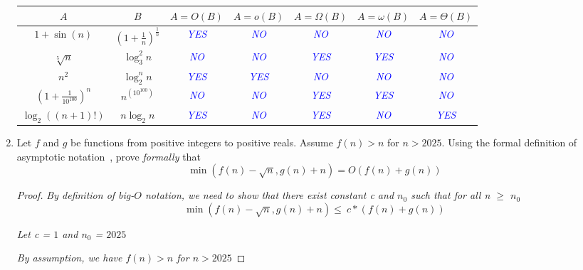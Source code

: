 \documentclass[dvipsnames]{article}
\begin{document}
\begin{enumerate}
    \begin{center}
    \bgroup
    \def\arraystretch{1.5}
    \begin{tabular}{ |c|c||c|c|c|c|c| }
     \hline
     $A$ & $B$ & $A = O(B)$ & $A = o(B)$ & $A = \Omega(B)$ & $A = \omega(B)$ & $A = \Theta(B)$ \\
     \hline
     \hline
     $1 + \sin(n)$ & $\left(1 + \frac{1}{n}\right)^{\frac{1}{n}}$ & \textcolor{blue}{\emph{YES}} & \textcolor{blue}{\emph{NO}} & \textcolor{blue}{\emph{NO}} & \textcolor{blue}{\emph{NO}} & \textcolor{blue}{\emph{NO}} \\
     \hline
     $\sqrt[5]{n}$ & $\log_3^2 n$ & \textcolor{blue}{\emph{NO}} & \textcolor{blue}{\emph{NO}} & \textcolor{blue}{\emph{YES}}  & \textcolor{blue}{\emph{YES}}  & \textcolor{blue}{\emph{NO}} \\
     \hline
     $n^2$ & $\log_2^n n$ & \textcolor{blue}{\emph{YES}} & \textcolor{blue}{\emph{YES}} & \textcolor{blue}{\emph{NO}} & \textcolor{blue}{\emph{NO}} & \textcolor{blue}{\emph{NO}} \\
     \hline
     $(1 + \frac{1}{10^{100}})^n$ & $n^{(10^{100})}$ & \textcolor{blue}{\emph{NO}} & \textcolor{blue}{\emph{NO}} & \textcolor{blue}{\emph{YES}} & \textcolor{blue}{\emph{YES}} & \textcolor{blue}{\emph{NO}} \\
     \hline
     $\log_2 \left( (n + 1)! \right)$ & $n \log_2 n$ & \textcolor{blue}{\emph{YES}} & \textcolor{blue}{\emph{NO}} & \textcolor{blue}{\emph{YES}} & \textcolor{blue}{\emph{NO}} & \textcolor{blue}{\emph{YES}} \\
     \hline
    \end{tabular}
    \egroup
    \end{center}

  \clearpage
  \item Let $f$ and $g$ be functions from positive integers to positive reals.
    Assume $f(n) > n$ for $n > 2025$.
    Using the formal definition of asymptotic notation~\cite[\S 3.2]{Cormen2022}, prove \emph{formally} that
    \[
      \min(f(n) - \sqrt{n}, g(n) + n) = O(f(n) + g(n))
    \]
  \color{blue}
  \begin{proof}
    \emph{By definition of big-$O$ notation, we need to show that there exist constant c and $n_0$ such that for all n $ \geq $ $n_0$}
    \[
      \min(f(n) - \sqrt{n}, g(n) + n) \leq \ c * (f(n) + g(n))
    \]

    \emph{Let c = $1$ and $n_0$ = $2025$}

    \emph{By assumption, we have $f(n) > n$ for $n > 2025$}


\end{proof}
\end{enumerate}
\end{document}
